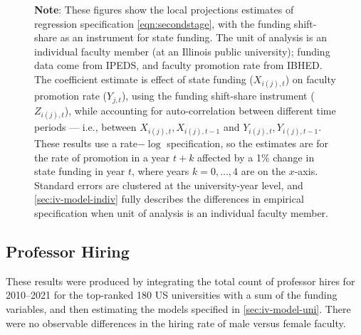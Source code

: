 \begin{figure}[H]
\begin{subfigure}[b]{0.495\textwidth}
        \label{fig:exit-administrator-illinois-lp-rolling}
    \end{subfigure}
    \label{fig:exit-illinois-lp-rolling}
    \justify
    \footnotesize
    \textbf{Note}:
    These figures show the local projections estimates of regression specification \eqref{eqn:secondstage}, with the funding shift-share as an instrument for state funding.
    The unit of analysis is an individual faculty member (at an Illinois public university); funding data come from IPEDS, and faculty promotion rate from IBHED.
    The coefficient estimate is effect of state funding ($X_{i(j),t}$) on faculty promotion rate ($Y_{j,t}$), using the funding shift-share instrument ($Z_{i(j),t}$), while accounting for auto-correlation between different time periods --- i.e., between $X_{i(j),t}, X_{i(j),t-1}$ and $Y_{i(j),t}, Y_{i(j),t-1}$.
    These results use a rate$-\log$ specification, so the estimates are for the rate of promotion in a year $t+k$ affected by a 1\% change in state funding in year $t$, where years $k = 0, \hdots, 4$ are on the $x$-axis. 
    Standard errors are clustered at the university-year level, and \autoref{sec:iv-model-indiv} fully describes the differences in empirical specification when unit of analysis is an individual faculty member.
\end{figure}

\newpage
\subsection{Professor Hiring}
\label{sec:appendix-hiring}

These results were produced by integrating the total count of professor hires for 2010--2021 for the top-ranked 180 US universities with a sum of the funding variables, and then estimating the models specified in \autoref{sec:iv-model-uni}.
There were no observable differences in the hiring rate of male versus female faculty.

